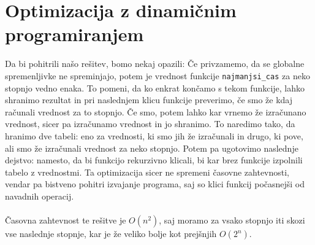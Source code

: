 \section{Optimizacija z dinamičnim programiranjem}\label{sec:optimizacija-z-dinamicnim-programiranjem}
Da bi pohitrili našo rešitev, bomo nekaj opazili:
Če privzamemo, da se globalne spremenljivke ne spreminjajo, potem je vrednost funkcije \texttt{najmanjsi\_cas} za neko stopnjo vedno enaka.
To pomeni, da ko enkrat končamo s tekom funkcije, lahko shranimo rezultat in pri naslednjem klicu funkcije preverimo, če smo že kdaj računali vrednost za to stopnjo.
Če smo, potem lahko kar vrnemo že izračunano vrednost, sicer pa izračunamo vrednost in jo shranimo.
To naredimo tako, da hranimo dve tabeli: eno za vrednosti, ki smo jih že izračunali in drugo, ki pove, ali smo že izračunali vrednost za neko stopnjo.
Potem pa ugotovimo naslednje dejstvo:
namesto, da bi funkcijo rekurzivno klicali, bi kar brez funkcije izpolnili tabelo z vrednostmi.
Ta optimizacija sicer ne spremeni časovne zahtevnosti, vendar pa bistveno pohitri izvajanje programa, saj so klici funkcij počasnejši od navadnih operacij.
\\
\\
Časovna zahtevnost te rešitve je $O(n^2)$, saj moramo za vsako stopnjo iti skozi vse naslednje stopnje, kar je že veliko bolje kot prejšnjih $O(2^n)$.

